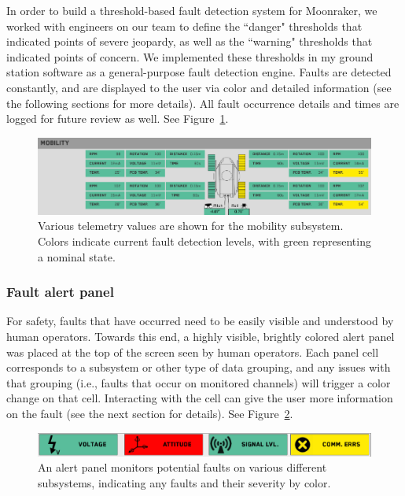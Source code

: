In order to build a threshold-based fault detection system for Moonraker, we worked with engineers on our team to define the ``danger" thresholds that indicated points of severe jeopardy, as well as the ``warning" thresholds that indicated points of concern. We implemented these thresholds in my ground station software as a general-purpose fault detection engine. Faults are detected constantly, and are displayed to the user via color and detailed information (see the following sections for more details). All fault occurrence details and times are logged for future review as well. See Figure~\ref{fig:mobility_telem_subpanel}.

\begin{figure}[h]
\centering
    \includegraphics[width=\columnwidth]{images/mobility_telem_subpanel.png}
    \caption{Various telemetry values are shown for the mobility subsystem. Colors indicate current fault detection levels, with green representing a nominal state.}
    \label{fig:mobility_telem_subpanel}
\end{figure}

\subsubsection{Fault alert panel}

For safety, faults that have occurred need to be easily visible and understood by human operators. Towards this end, a highly visible, brightly colored alert panel was placed at the top of the screen seen by human operators. Each panel cell corresponds to a subsystem or other type of data grouping, and any issues with that grouping (i.e., faults that occur on monitored channels) will trigger a color change on that cell. Interacting with the cell can give the user more information on the fault (see the next section for details). See Figure~\ref{fig:alert_panel}.

\begin{figure}[h]
\centering
    \includegraphics[width=\columnwidth]{images/alert_panel.png}
    \caption{An alert panel monitors potential faults on various different subsystems, indicating any faults and their severity by color.}
    \label{fig:alert_panel}
\end{figure}

